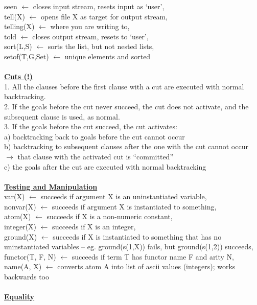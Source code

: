 \documentclass[8pt,letterpaper,twocolumn]{article}
\begin{document}
seen $\leftarrow$ closes input stream, resets input as ‘user’,\\
tell(X) $\leftarrow$ opens file X as target for output stream,\\
telling(X) $\leftarrow$ where you are writing to,\\
told $\leftarrow$ closes output stream, resets to ‘user’,\\
sort(L,S) $\leftarrow$ sorts the list, but not nested lists,\\
setof(T,G,Set) $\leftarrow$ unique elements and sorted\\
\\
\underline{\textbf{Cuts (!)}}\\
1. All the clauses before the first clause with a cut are executed with normal backtracking.\\
2. If the goals before the cut never succeed, the cut does not activate, and the subsequent clause is used, as normal.\\
3. If the goals before the cut succeed, the cut activates:\\
a) backtracking back to goals before the cut cannot occur\\
b) backtracking to subsequent clauses after the one with the cut cannot occur
$\rightarrow$ that clause with the activated cut is “committed”\\
c) the goals after the cut are executed with normal backtracking\\
\\
\underline{\textbf{Testing and Manipulation}}\\
var(X) $\leftarrow$ succeeds if argument X is an uninstantiated variable,\\
nonvar(X) $\leftarrow$ succeeds if argument X is instantiated to something,\\
atom(X) $\leftarrow$ succeeds if X is a non-numeric constant,\\
integer(X) $\leftarrow$ succeeds if X is an integer,\\
ground(X) $\leftarrow$ succeeds if X is instantiated to something that has no uninstantiated variables – eg. ground(s(1,X)) fails, but ground(s(1,2)) succeeds,\\
functor(T, F, N) $\leftarrow$ succeeds if term T has functor name F and arity N,\\
name(A, X) $\leftarrow$ converts atom A into list of ascii values (integers); works backwards too\\
\\
\underline{\textbf{Equality}}\\
\end{document}
